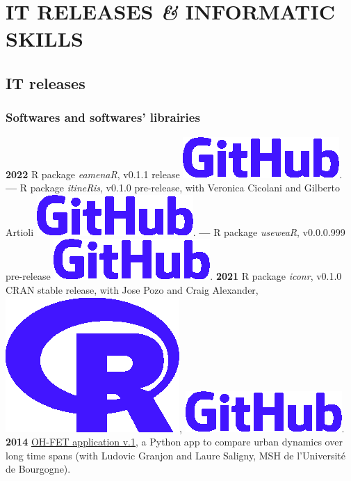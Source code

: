 \documentclass{article}
\begin{document}
\section{IT RELEASES \textit{\&} INFORMATIC SKILLS}

\subsection*{IT releases}

\subsubsection*{Softwares and softwares' librairies}

\textbf{2022 }\textsf{R} package \textit{eamenaR}, v0.1.1 release \href{https://github.com/eamena-project/eamenaR/tree/main#readme}{\includegraphics[scale=0.12]{github-rect.png}}.
\smallbreak
\textbf{--- }\textsf{R} package \textit{itineRis}, v0.1.0 pre-release, with Veronica Cicolani and Gilberto Artioli \href{https://github.com/zoometh/itineRis/tree/main#readme}{\includegraphics[scale=0.12]{github-rect.png}}.
\textbf{--- }\textsf{R} package \textit{useweaR}, v0.0.0.999 pre-release \href{https://github.com/zoometh/itineRis/tree/main#readme}{\includegraphics[scale=0.12]{github-rect.png}}.
\smallbreak
\textbf{2021 }\textsf{R} package \textit{iconr}, v0.1.0 CRAN stable release, with Jose Pozo and Craig Alexander, \href{https://cran.r-project.org/web/packages/iconr/index.html}{\includegraphics[scale=0.04]{prog-r.png}}, \href{https://github.com/zoometh/iconr#readme}{\includegraphics[scale=0.12]{github-rect.png}}.
\smallbreak
\textbf{2014 }\href{https://www.oxbowbooks.com/dbbc/caa2014-21st-century-archaeology.html/}{OH-FET application v.1}, a \textsf{Python} app to compare urban dynamics over long time spans (with Ludovic Granjon and Laure Saligny, MSH de l'Universit\'{e} de Bourgogne).
\end{document}
